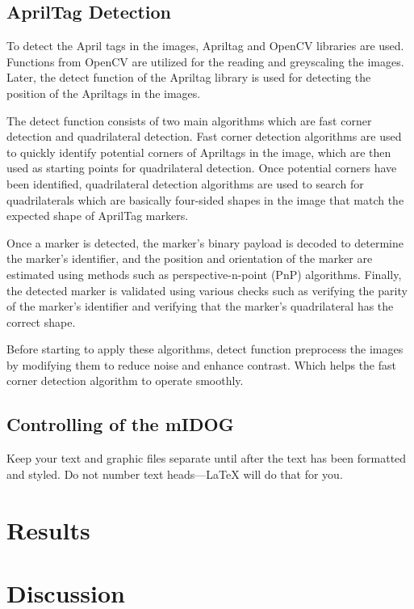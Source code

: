 \documentclass[conference]{IEEEtran}
\begin{document}
    
    \subsection{AprilTag Detection}
        To detect the April tags in the images, Apriltag and OpenCV libraries are used. Functions from OpenCV are utilized for the reading and greyscaling the images. Later, the detect function of the Apriltag library is used for detecting the position of the Apriltags in the images. 

        The detect function consists of two main algorithms which are fast corner detection and quadrilateral detection. Fast corner detection algorithms are used to quickly identify potential corners of Apriltags in the image, which are then used as starting points for quadrilateral detection. Once potential corners have been identified, quadrilateral detection algorithms are used to search for quadrilaterals which are basically four-sided shapes in the image that match the expected shape of AprilTag markers.

        Once a marker is detected, the marker's binary payload is decoded to determine the marker's identifier, and the position and orientation of the marker are estimated using methods such as perspective-n-point (PnP) algorithms. Finally, the detected marker is validated using various checks such as verifying the parity of the marker's identifier and verifying that the marker's quadrilateral has the correct shape.

        Before starting to apply these algorithms, detect function preprocess the images by modifying them to reduce noise and enhance contrast. Which helps the fast corner detection algorithm to operate smoothly. 
    
    \subsection{Controlling of the mIDOG }

Keep your text and graphic files separate until after the text has been 
formatted and styled. Do not number text heads---{\LaTeX} will do that 
for you.

\section{Results}

\section{Discussion}
\end{document}
